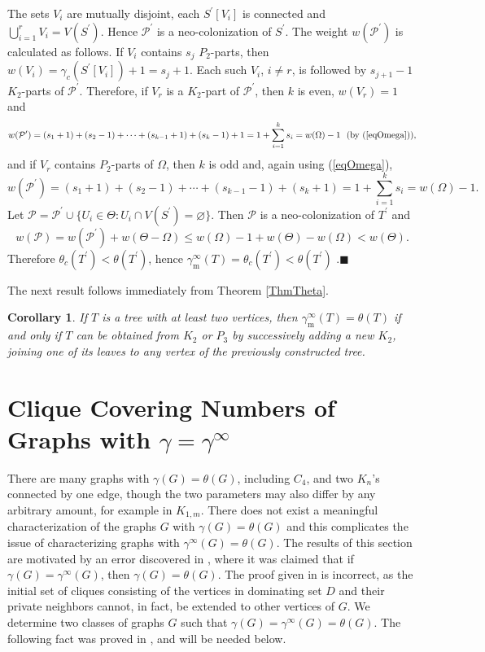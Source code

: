 \documentclass[12pt]{article}%
\newtheorem{corollary}[theorem]{Corollary}
\begin{document}
The sets $V_{i}$ are mutually disjoint, each $S^{\prime}[V_{i}]$ is connected
and $\bigcup_{i=1}^{r}V_{i}=V(S^{\prime})$. Hence $\mathcal{P}^{\prime}$ is a
neo-colonization of $S^{\prime}$. The weight $w(\mathcal{P}^{\prime})$ is
calculated as follows. If $V_{i}$ contains $s_{j}$ $P_{2}$-parts, then
$w(V_{i})=\gamma_{c}(S^{\prime}[V_{i}])+1=s_{j}+1$. Each such $V_{i}$, $i\neq
r$, is followed by $s_{j+1}-1$ $K_{2}$-parts of $\mathcal{P}^{\prime}$.
Therefore, if $V_{r}$ is a $K_{2}$-part of $\mathcal{P}^{\prime}$, then $k$ is
even, $w(V_{r})=1$ and
\[
w(\mathcal{P}^{\prime})=(s_{1}+1)+(s_{2}-1)+\cdots+(s_{k-1}+1)+(s_{k}%
-1)+1=1+\sum_{i=1}^{k}s_{i}=w(\Omega)-1\ \ \text{(by (\ref{eqOmega}))},
\]
and if $V_{r}$ contains $P_{2}$-parts of $\Omega$, then $k$ is odd and, again
using (\ref{eqOmega}),%
\[
w(\mathcal{P}^{\prime})=(s_{1}+1)+(s_{2}-1)+\cdots+(s_{k-1}-1)+(s_{k}%
+1)=1+\sum_{i=1}^{k}s_{i}=w(\Omega)-1.
\]
Let $\mathcal{P}=\mathcal{P}^{\prime}\cup\{U_{i}\in\Theta:U_{i}\cap
V(S^{\prime})=\varnothing\}$. Then $\mathcal{P}$ is a neo-colonization of
$T^{\prime}$ and%
\[
w(\mathcal{P})=w(\mathcal{P}^{\prime})+w(\Theta-\Omega)\leq w(\Omega
)-1+w(\Theta)-w(\Omega)<w(\Theta).
\]
Therefore $\theta_{c}(T^{\prime})<\theta(T^{\prime})$, hence $\gamma
_{\mathrm{m}}^{\infty}(T)=\theta_{c}(T^{\prime})<\theta(T^{\prime})$%
.\hfill$\blacksquare$

\bigskip

The next result follows immediately from Theorem \ref{ThmTheta}.

\begin{corollary}
If $T$ is a tree with at least two vertices, then $\gamma_{\mathrm{m}}%
^{\infty}(T)=\theta(T)$ if and only if $T$ can be obtained from $K_{2}$ or
$P_{3}$ by successively adding a new $K_{2}$, joining one of its leaves to any
vertex of the previously constructed tree.
\end{corollary}

\section{Clique Covering Numbers of Graphs with $\gamma=\gamma^{\infty}$}

\label{SecTheta}There are many graphs with $\gamma(G)=\theta(G)$, including
$C_{4}$, and two $K_{n}$'s connected by one edge, though the two parameters
may also differ by any arbitrary amount, for example in $K_{1,m}$. There does
not exist a meaningful characterization of the graphs $G$ with $\gamma
(G)=\theta(G)$ and this complicates the issue of characterizing graphs with
$\gamma^{\infty}(G)=\theta(G)$. The results of this section are motivated by
an error discovered in \cite{KM2}, where it was claimed that if $\gamma
(G)=\gamma^{\infty}(G)$, then $\gamma(G)=\theta(G)$. The proof given in
\cite{KM2} is incorrect, as the initial set of cliques consisting of the
vertices in dominating set $D$ and their private neighbors cannot, in fact, be
extended to other vertices of $G$. We determine two classes of graphs $G$ such
that $\gamma(G)=\gamma^{\infty}(G)=\theta(G)$. The following fact was proved
in \cite{KM2}, and will be needed below.
\end{document}
